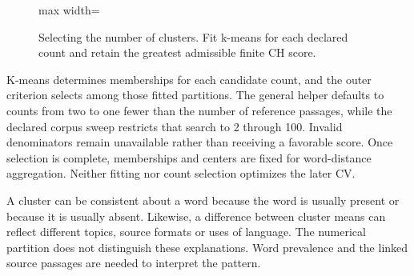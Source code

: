 \documentclass[10pt,letterpaper]{article}
\begin{document}
\begin{figure}[H]
\begin{adjustbox}{max width=\linewidth}
%
\endgroup%

\end{adjustbox}
\caption{Selecting the number of clusters. Fit k-means for each declared count and retain the greatest admissible finite CH score.}
\label{fig:ksearch}
\end{figure}
\FloatBarrier
K-means determines memberships for each candidate count, and the outer criterion selects among those fitted partitions. The general helper defaults to counts from two to one fewer than the number of reference passages, while the declared corpus sweep restricts that search to 2 through 100. Invalid denominators remain unavailable rather than receiving a favorable score. Once selection is complete, memberships and centers are fixed for word-distance aggregation. Neither fitting nor count selection optimizes the later CV.\par

A cluster can be consistent about a word because the word is usually present or because it is usually absent. Likewise, a difference between cluster means can reflect different topics, source formats or uses of language. The numerical partition does not distinguish these explanations. Word prevalence and the linked source passages are needed to interpret the pattern.\par
\end{document}
